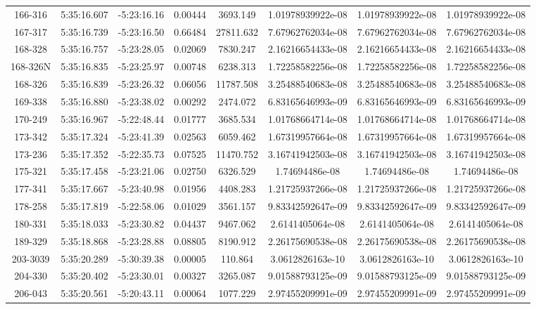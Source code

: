 \begin{table}
\begin{tabular}{cccccccc}
166-316 & 5:35:16.607 & -5:23:16.16 & 0.00444 & 3693.149 & 1.01978939922e-08 & 1.01978939922e-08 & 1.01978939922e-08 \\
167-317 & 5:35:16.739 & -5:23:16.50 & 0.66484 & 27811.632 & 7.67962762034e-08 & 7.67962762034e-08 & 7.67962762034e-08 \\
168-328 & 5:35:16.757 & -5:23:28.05 & 0.02069 & 7830.247 & 2.16216654433e-08 & 2.16216654433e-08 & 2.16216654433e-08 \\
168-326N & 5:35:16.835 & -5:23:25.97 & 0.00748 & 6238.313 & 1.72258582256e-08 & 1.72258582256e-08 & 1.72258582256e-08 \\
168-326 & 5:35:16.839 & -5:23:26.32 & 0.06056 & 11787.508 & 3.25488540683e-08 & 3.25488540683e-08 & 3.25488540683e-08 \\
169-338 & 5:35:16.880 & -5:23:38.02 & 0.00292 & 2474.072 & 6.83165646993e-09 & 6.83165646993e-09 & 6.83165646993e-09 \\
170-249 & 5:35:16.967 & -5:22:48.44 & 0.01777 & 3685.534 & 1.01768664714e-08 & 1.01768664714e-08 & 1.01768664714e-08 \\
173-342 & 5:35:17.324 & -5:23:41.39 & 0.02563 & 6059.462 & 1.67319957664e-08 & 1.67319957664e-08 & 1.67319957664e-08 \\
173-236 & 5:35:17.352 & -5:22:35.73 & 0.07525 & 11470.752 & 3.16741942503e-08 & 3.16741942503e-08 & 3.16741942503e-08 \\
175-321 & 5:35:17.458 & -5:23:21.06 & 0.02750 & 6326.529 & 1.74694486e-08 & 1.74694486e-08 & 1.74694486e-08 \\
177-341 & 5:35:17.667 & -5:23:40.98 & 0.01956 & 4408.283 & 1.21725937266e-08 & 1.21725937266e-08 & 1.21725937266e-08 \\
178-258 & 5:35:17.819 & -5:22:58.06 & 0.01029 & 3561.157 & 9.83342592647e-09 & 9.83342592647e-09 & 9.83342592647e-09 \\
180-331 & 5:35:18.033 & -5:23:30.82 & 0.04437 & 9467.062 & 2.6141405064e-08 & 2.6141405064e-08 & 2.6141405064e-08 \\
189-329 & 5:35:18.868 & -5:23:28.88 & 0.08805 & 8190.912 & 2.26175690538e-08 & 2.26175690538e-08 & 2.26175690538e-08 \\
203-3039 & 5:35:20.289 & -5:30:39.38 & 0.00005 & 110.864 & 3.0612826163e-10 & 3.0612826163e-10 & 3.0612826163e-10 \\
204-330 & 5:35:20.402 & -5:23:30.01 & 0.00327 & 3265.087 & 9.01588793125e-09 & 9.01588793125e-09 & 9.01588793125e-09 \\
206-043 & 5:35:20.561 & -5:20:43.11 & 0.00064 & 1077.229 & 2.97455209991e-09 & 2.97455209991e-09 & 2.97455209991e-09 \\

\end{tabular}
\end{table}
